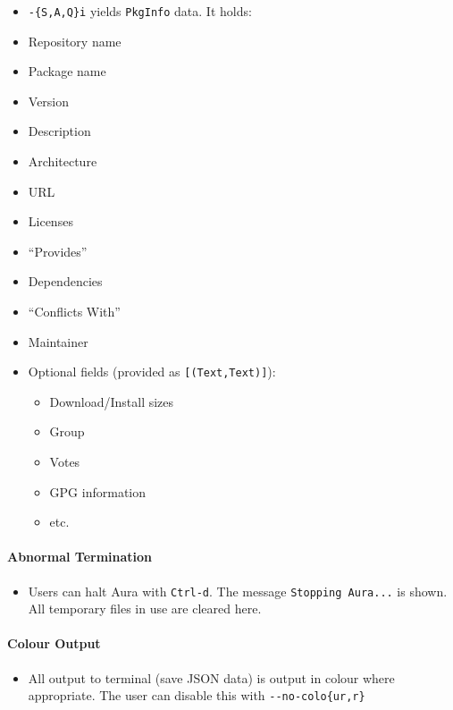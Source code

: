 \documentclass{article}
\begin{document}
\begin{itemize}
\itemsep1pt\parskip0pt
\item
  \texttt{-\{S,A,Q\}i} yields \texttt{PkgInfo} data. It holds:
\item
  Repository name
\item
  Package name
\item
  Version
\item
  Description
\item
  Architecture
\item
  URL
\item
  Licenses
\item
  ``Provides''
\item
  Dependencies
\item
  ``Conflicts With''
\item
  Maintainer
\item
  Optional fields (provided as \texttt{{[}(Text,Text){]}}):

  \begin{itemize}
  \itemsep1pt\parskip0pt
  \item
    Download/Install sizes
  \item
    Group
  \item
    Votes
  \item
    GPG information
  \item
    etc.
  \end{itemize}
\end{itemize}

\paragraph{Abnormal Termination}\label{abnormal-termination}

\begin{itemize}
\itemsep1pt\parskip0pt
\item
  Users can halt Aura with \texttt{Ctrl-d}. The message
  \texttt{Stopping Aura...} is shown. All temporary files in use are
  cleared here.
\end{itemize}

\paragraph{Colour Output}\label{colour-output}

\begin{itemize}
\itemsep1pt\parskip0pt
\item
  All output to terminal (save JSON data) is output in colour where
  appropriate. The user can disable this with
  \texttt{-\/-no-colo\{ur,r\}}
\end{itemize}
\end{document}
